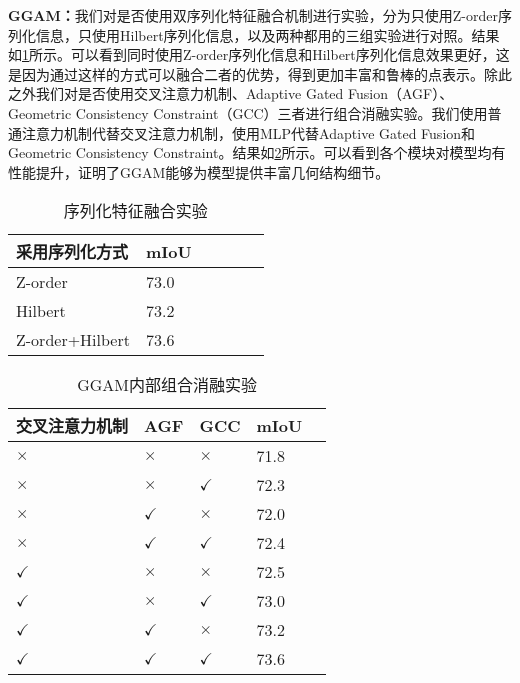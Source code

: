 \documentclass[preprint,12pt]{elsarticle}
\begin{document}
\textbf{GGAM：}我们对是否使用双序列化特征融合机制进行实验，分为只使用Z-order序列化信息，只使用Hilbert序列化信息，以及两种都用的三组实验进行对照。结果如\cref{tab:doubleSerial}所示。可以看到同时使用Z-order序列化信息和Hilbert序列化信息效果更好，这是因为通过这样的方式可以融合二者的优势，得到更加丰富和鲁棒的点表示。除此之外我们对是否使用交叉注意力机制、Adaptive Gated Fusion（AGF）、Geometric Consistency Constraint（GCC）三者进行组合消融实验。我们使用普通注意力机制代替交叉注意力机制，使用MLP代替Adaptive Gated Fusion和Geometric Consistency Constraint。结果如\cref{tab:ggamCombine}所示。可以看到各个模块对模型均有性能提升，证明了GGAM能够为模型提供丰富几何结构细节。
\begin{table}[htbp!]
	\centering  %
	\caption{序列化特征融合实验}
	\label{tab:doubleSerial}
	\begin{tabular}{@{}llllll@{}}
		\toprule
		采用序列化方式 & mIoU \\ \midrule
		Z-order & 73.0 \\
		Hilbert & 73.2 \\
		Z-order+Hilbert & 73.6 \\
		\bottomrule
	\end{tabular}
\end{table}

\begin{table}[htbp!]
	\centering
	\caption{GGAM内部组合消融实验}
	\label{tab:ggamCombine}
	\begin{tabular}{@{}lllll@{}}
		\toprule
		交叉注意力机制 & AGF & GCC &mIoU \\ 
		\midrule
		$\times$       & $\times$ & $\times$ & 71.8       \\
		$\times$       & $\times$ & $\checkmark$ & 72.3       \\
		$\times$       & $\checkmark$ & $\times$ & 72.0       \\
		$\times$       & $\checkmark$ & $\checkmark$ & 72.4       \\
		$\checkmark$    & $\times$ & $\times$ & 72.5       \\
		$\checkmark$    & $\times$ & $\checkmark$ & 73.0       \\
		$\checkmark$    & $\checkmark$ & $\times$ & 73.2       \\
		$\checkmark$    & $\checkmark$ & $\checkmark$ & 73.6       \\
		\bottomrule
	\end{tabular}
\end{table}
\end{document}
